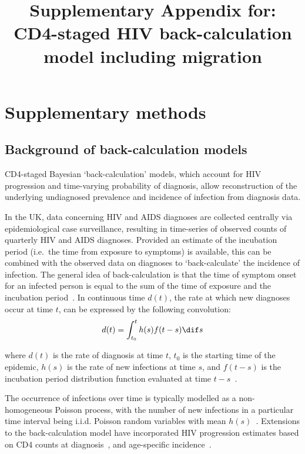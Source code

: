 \documentclass[11pt, a4paper]{article}
\title{Supplementary Appendix for: CD4-staged HIV back-calculation model including migration}
\author{}
\date{}
\begin{document}
\maketitle
\tableofcontents
\cleardoublepage

\section{Supplementary methods}

\subsection{Background of back-calculation models}

CD4-staged Bayesian `back-calculation' models, which account for HIV progression and time-varying probability of diagnosis, allow reconstruction of the underlying undiagnosed prevalence and incidence of infection from diagnosis data.

In the UK, data concerning HIV and AIDS diagnoses are collected centrally via epidemiological case surveillance, resulting in time-series of observed counts of quarterly HIV and AIDS diagnoses. Provided an estimate of the incubation period (i.e.\ the time from exposure to symptoms) is available, this can be combined with the observed data on diagnoses to `back-calculate' the incidence of infection. The general idea of back-calculation is that the time of symptom onset for an infected person is equal to the sum of the time of exposure and the incubation period~\parencite{egan_review_2015}. In continuous time $d(t)$, the rate at which new diagnoses occur at time $t$, can be expressed by the following convolution:
%
\[
  d(t) = \int_{t_0}^t{h(s)f(t-s) \dif s}
\]

where $d(t)$ is the rate of diagnosis at time $t$, $t_0$ is the starting time of the epidemic, $h(s)$ is the rate of new infections at time $s$, and $f(t-s)$ is the incubation period distribution function evaluated at time $t-s$~\parencite{brookmeyer_aids_1994}.

The occurrence of infections over time is typically modelled as a non-homogeneous Poisson process, with the number of new infections in a particular time interval being i.i.d. Poisson random variables with mean $h(s)$~\parencite{becker_method_1991, rosenberg_backcalculation_1991}. Extensions to the back-calculation model have incorporated HIV progression estimates based on CD4 counts at diagnosis~\parencite{sweeting_bayesian_2005, birrell_estimating_2012}, and age-specific incidence~\parencite{brizzi_extending_2019}.
\end{document}
